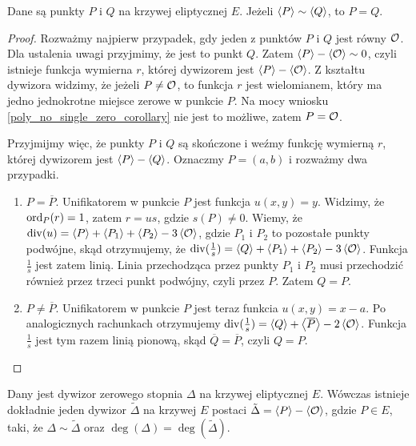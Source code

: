 \begin{lemma}\label{sim_pq_eq_pq_lemma}
Dane są punkty $P$ i $Q$ na krzywej eliptycznej $E$.
Jeżeli $\left\langle P\right\rangle \sim \left\langle Q\right\rangle$,
to $P = Q$.
\end{lemma}

\begin{proof}
Rozważmy najpierw przypadek,
gdy jeden z punktów $P$ i $Q$ jest równy $\mathcal{O}$.
Dla ustalenia uwagi przyjmimy, że jest to punkt $Q$.
Zatem $\left\langle P\right\rangle - \left\langle\mathcal{O}\right\rangle \sim 0$,
czyli istnieje funkcja wymierna $r$,
której dywizorem jest $\left\langle P\right\rangle - \left\langle\mathcal{O}\right\rangle$.
Z kształtu dywizora widzimy, że jeżeli $P \neq \mathcal{O}$, to funkcja $r$
jest wielomianem, który ma jedno jednokrotne miejsce zerowe w punkcie $P$.
Na mocy wniosku \ref{poly_no_single_zero_corollary} nie jest to możliwe,
zatem $P = \mathcal{O}$.

\noindent
Przyjmijmy więc, że punkty $P$ i $Q$ są skończone
i weźmy funkcję wymierną $r$, której dywizorem jest $\left\langle P\right\rangle - \left\langle Q\right\rangle$.
Oznaczmy $P = (a, b)$ i rozważmy dwa przypadki.
\begin{enumerate}
\item $P = \overline{P}$.
Unifikatorem w punkcie $P$ jest funkcja $u(x, y) = y$.
Widzimy, że $\operatorname{ord}_P(r) = 1$, zatem $r = us$, gdzie $s(P) \neq 0$.
Wiemy, że $\operatorname{div}(u) = \left\langle P\right\rangle + \left\langle P_1\right\rangle + \left\langle P_2\right\rangle - 3\left\langle\mathcal{O}\right\rangle$,
gdzie $P_1$ i $P_2$ to pozostałe punkty podwójne,
skąd otrzymujemy, że
$\operatorname{div}(\frac{1}{s}) = \left\langle Q\right\rangle + \left\langle P_1\right\rangle + \left\langle P_2\right\rangle - 3\left\langle\mathcal{O}\right\rangle$.
Funkcja $\frac{1}{s}$ jest zatem linią.
Linia przechodząca przez punkty $P_1$ i $P_2$ musi przechodzić również przez
trzeci punkt podwójny, czyli przez $P$. Zatem $Q = P$.
\item $P \neq \overline{P}$.
Unifikatorem w punkcie $P$ jest teraz funkcia $u(x, y) = x - a$.
Po analogicznych rachunkach otrzymujemy
$\operatorname{div}(\frac{1}{s}) = \left\langle Q\right\rangle + \left\langle\overline{P}\right\rangle - 2\left\langle\mathcal{O}\right\rangle$.
Funkcja $\frac{1}{s}$ jest tym razem linią pionową,
skąd $\overline{Q} = \overline{P}$, czyli $Q = P$.
\end{enumerate}
\end{proof}

\begin{theorem}\label{zerodeg_divisor_linear_reduction_theorem}
Dany jest dywizor zerowego stopnia $\Delta$ na krzywej eliptycznej $E$.
Wówczas istnieje dokładnie jeden dywizor $\tilde{\Delta}$ na krzywej $E$
postaci $\tilde{\Delta} = \left\langle P\right\rangle - \left\langle\mathcal{O}\right\rangle$, gdzie $P \in E$, taki,
że $\Delta \sim \tilde{\Delta}$ oraz $\deg(\Delta) = \deg(\tilde{\Delta})$.
\end{theorem}

